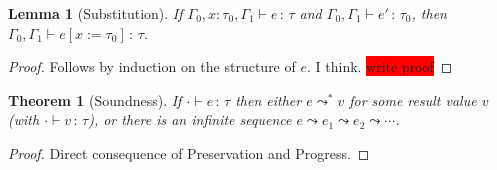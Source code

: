 \documentclass{article}
\newcommand{\todo}[1]{\colorbox{red}{#1}}
\newtheorem{theorem}{Theorem}
\newtheorem{lemma}{Lemma}
\newcommand{\hastp}[3]{#1 \vdash #2 \,:\, #3}
\newcommand{\steps}[2]{#1 \leadsto^* #2}
\begin{document}
\begin{lemma}[Substitution] \label{lem:substitution} If \(\hastp {\Gamma_0, x :
    \tau_0, \Gamma_1} e \tau\) and \(\hastp {\Gamma_0, \Gamma_1} {e'}
  {\tau_0}\), then \(\hastp {\Gamma_0, \Gamma_1} {e[x:=\tau_0]} \tau\).
\end{lemma}

\begin{proof}
  Follows by induction on the structure of \(e\). I think. \todo{write proof}
\end{proof}

\begin{theorem}[Soundness]
If $\hastp{\cdot}{e}{\tau}$ then either $\steps{e}{v}$ for some result value $v$
(with $\hastp{\cdot}{v}{\tau}$), or
there is an infinite sequence $e \leadsto e_1 \leadsto e_2 \leadsto \cdots$.
\end{theorem}

\begin{proof}
Direct consequence of Preservation and Progress.
\end{proof}
\end{document}
